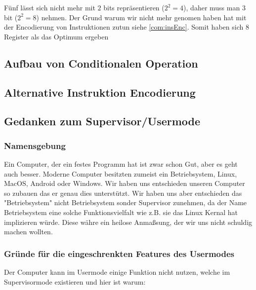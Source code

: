 \documentclass{scrartcl}
\begin{document}
Fünf lässt sich nicht mehr mit $2$ bits repräsentieren ($2^2 = 4$), daher muss man $3$ bit ($2^2 = 8$) nehmen. Der Grund warum wir nicht mehr genomen haben hat mit der Encodierung von Instruktionen zutun siehe \autoref{com:insEnc}. Somit haben sich $8$ Register als das Optimum ergeben

\subsection{\label{com:conditionals}Aufbau von Conditionalen Operation}

\subsection{\label{com:insEnc}Alternative Instruktion Encodierung}

\subsection{\label{com:Supervisor}Gedanken zum Supervisor/Usermode}

\subsubsection{Namensgebung}
Ein Computer, der ein festes Programm hat ist zwar schon Gut, aber es geht auch besser. Moderne Computer besitzten zumeist ein Betriebsystem, Linux, MacOS, Android oder Windows. Wir haben uns entschieden unseren Computer so zubauen das er genau dies unterstützt. Wir haben uns aber entschieden das "Betriebsystem" nicht Betriebsystem sonder Supervisor zunehmen, da der Name Betriebsystem eine solche Funktionsvielfalt wie z.B. sie das Linux Kernal hat implizieren würde. Diese währe ein heilose Anmaßsung, der wir uns nicht schuldig machen wollten.

\subsubsection{Gründe für die eingeschrenkten Features des Usermodes}
Der Computer kann im Usermode einige Funktion nicht nutzen, welche im Supervisormode existieren und hier ist warum:
\end{document}
